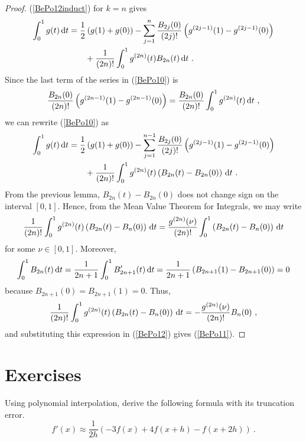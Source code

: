 \begin{proof}
(\ref{BePo12induct}) for $k=n$ gives
\begin{equation}\label{BePo10}
\begin{split}
\int_0^1 g(t)\,\mathrm{d}t &= \frac{1}{2} \left(g(1)+g(0)\right)
- \sum_{j=1}^n \frac{B_{2j}(0)}{(2j)!}
\left(g^{(2j-1)}(1)-g^{(2j-1)}(0)\right) \\
& \qquad + \frac{1}{(2n)!} \int_0^1 g^{(2n)}(t) B_{2n}(t) \,\mathrm{d}t \ .
\end{split}
\end{equation}
Since the last term of the series in (\ref{BePo10}) is
\[
\frac{B_{2n}(0)}{(2n)!}
\left(g^{(2n-1)}(1)-g^{(2n-1)}(0)\right)
= \frac{B_{2n}(0)}{(2n)!} \int_0^1 g^{(2n)}(t)\,\mathrm{d}t \ ,
\]
we can rewrite (\ref{BePo10}) as
\begin{equation}\label{BePo12}
\begin{split}
\int_0^1 g(t)\,\mathrm{d}t& = \frac{1}{2} \left(g(1)+g(0)\right)
- \sum_{j=1}^{n-1} \frac{B_{2j}(0)}{(2j)!}
\left(g^{(2j-1)}(1)-g^{(2j-1)}(0)\right)\\
& \qquad + \frac{1}{(2n)!} \int_0^1 g^{(2n)}(t)
\left( B_{2n}(t) - B_{2n}(0)\right) \,\mathrm{d}t \ .
\end{split}
\end{equation}
From the previous lemma, $B_{2n}(t) - B_{2n}(0)$ does not change sign on
the interval $[0,1]$.  Hence, from the Mean Value Theorem for
Integrals, we may write
\[
\frac{1}{(2n)!} \int_0^1 g^{(2n)}(t)
\left( B_{2n}(t) - B_n(0)\right) \,\mathrm{d}t =
\frac{g^{(2n)}(\nu)}{(2n)!} \int_0^1 
\left( B_{2n}(t) - B_n(0)\right) \,\mathrm{d}t
\]
for some $\nu \in [0,1]$.  Moreover,
\[
\int_0^1 B_{2n}(t) \,\mathrm{d}t
= \frac{1}{2n+1}\int_0^1 B_{2n+1}'(t) \,\mathrm{d}t
= \frac{1}{2n+1}\left( B_{2n+1}(1)-B_{2n+1}(0) \right) = 0
\]
because $B_{2n+1}(0) = B_{2n+1}(1) = 0$.  Thus,
\[
\frac{1}{(2n)!} \int_0^1 g^{(2n)}(t)
\left( B_{2n}(t) - B_n(0)\right) \,\mathrm{d}t =
- \frac{g^{(2n)}(\nu)}{(2n)!} B_n(0) \ ,
\]
and substituting this expression in (\ref{BePo12}) gives
(\ref{BePo11}).
\end{proof}

\section{Exercises}

\begin{question}
Using polynomial interpolation, derive the following formula with its
truncation error.
\begin{equation}\label{dfapproxA}
f'(x) \approx \frac{1}{2h}\left(-3f(x)+4f(x+h)-f(x+2h)\right) \ .
\end{equation}
\label{diffQ1}
\end{question}

